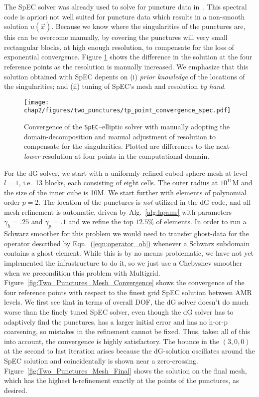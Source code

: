 The SpEC solver was already used to solve for puncture data
in~\cite{dennison2006,lovelace2008}.  This spectral code is apriori
not well suited for puncture data which results in a non-smooth
solution $u(\vec x)$.  Because we know where the singularities of the
punctures are, this can be overcome manually, by covering the
punctures will very small rectangular blocks, at high enough
resolution, to compensate for the loss of exponential
convergence. Figure \ref{fig:spec_point_convergence} shows the
difference in the solution at the four reference points as the
resolution is manually increased. We emphasize that this
  solution obtained with SpEC depents on (i) \textit{prior knowledge}
  of the locations of the singularities; and (ii) tuning of SpEC's
  mesh and resolution \textit{by hand}.



\begin{figure}
\texttt{[image: chap2/figures/two\_punctures/tp\_point\_convergence\_spec.pdf]}
\caption{
  \label{fig:spec_point_convergence}
  Convergence of the \texttt{SpEC}--elliptic solver with manually
  adopting the domain-decomposition and manual adjustment of
  resolution to compensate for the singularities. Plotted are differences to the
  next-\emph{lower} resolution at four points in the computational domain. }
\end{figure}


For the dG solver, we start with a uniformly refined cubed-sphere mesh
at level $l=1$, i.e.\ 13 blocks, each consisting of eight cells.  The  outer radius at $10^{11}$M and the size of the inner cube is 10M.  We start further with elements of  polynomial
order $p=2$.  The location of the punctures is \textit{not} utilized in the dG code, and all mesh-refinement is automatic, driven by Alg.~\ref{alg:hpamr}  with parameters $\gamma_h = .25$ and $\gamma_p = .1$ and we refine the top $12.5\%$ of elements. In order
to run a Schwarz smoother for this problem we would need to transfer
ghost-data for the operator described by Eqn.~(\ref{eqn:operator_oh})
whenever a Schwarz subdomain contains a ghost element. While this is
by no means problematic, we have not yet implemented the
infrastructure to do it, so we just use a Chebyshev smoother when we
precondition this problem with
Multigrid. Figure~\ref{fig:Two_Punctures_Mesh_Convergence} shows the
convergence of the four reference points with respect to the finest
grid SpEC solution between AMR levels. We first see that in terms of
overall DOF, the dG solver doesn't do much worse than the finely tuned
SpEC solver, even though the dG solver has to adaptively find the
punctures, has a larger initial error and has no h-or-p coarsening, so
mistakes in the refinement cannot be fixed. Thus, taken all of this
into account, the convergence is highly satisfactory.  The bounce
in the $(3,0,0)$ at the second to last iteration arises because the dG-solution oscillates around the SpEC solution and coincidentally is shown near a zero-crossing. Figure~\ref{fig:Two_Punctures_Mesh_Final} shows the solution on the final mesh, which has the highest h-refinement exactly at the points of the punctures, as desired.

